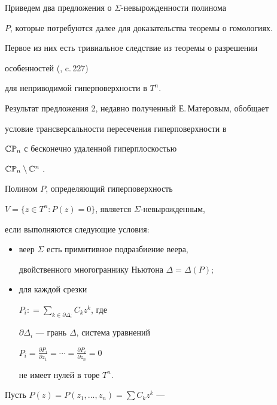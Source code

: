 Приведем два предложения о $\Sigma$-невырожденности полинома


$P$, которые потребуются далее для доказательства теоремы о гомологиях.


Первое из них есть тривиальное следствие из теоремы о разрешении


особенностей (\cite{H2}, c.\,227)


для неприводимой гиперповерхности в $T^n$.


Результат предложения 2, недавно полученный Е.\,Матеровым, обобщает


условие трансверсальности пересечения гиперповерхности в


$\Bbb{CP}_n$ с бесконечно удаленной гиперплоскостью


$\Bbb{CP}_n\setminus \Bbb{C}^n$ \cite{AA}.





\begin{prop}


Полином $P$, определяющий гиперповерхность


$V=\{z\in T^n: P(z)=0\}$, является $\Sigma$-невырожденным,


если выполняются следующие условия:


\begin{itemize}


\item[(i)]


веер $\Sigma$ есть примитивное подразбиение веера,


двойственного многограннику Ньютона $\Delta=\Delta(P);$


\item[(ii)]


для каждой срезки


$P_i: =\sum\limits_{k\in\partial\Delta_i} C_k z^k$, где


$\partial\Delta_i$ --- грань $\Delta$, система уравнений


$P_i=\frac{\partial P_i}{\partial z_1}=\dotsb


=\frac{\partial P_i}{\partial z_n}=0$


не имеет нулей в торе $T^n$.


\end{itemize}


\end{prop}





Пусть $P(z)=P(z_1,\dotsc, z_n)=\sum C_k z^k$ ---


